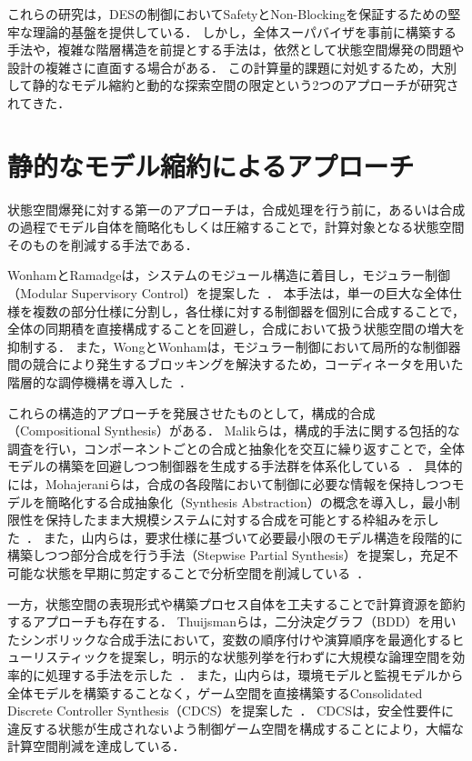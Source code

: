 \documentclass[a4paper,11pt,oneside,openany,report,dvipdfmx]{jsbook}
\begin{document}
これらの研究は，DESの制御においてSafetyとNon-Blockingを保証するための堅牢な理論的基盤を提供している．
しかし，全体スーパバイザを事前に構築する手法や，複雑な階層構造を前提とする手法は，依然として状態空間爆発の問題や設計の複雑さに直面する場合がある．
この計算量的課題に対処するため，大別して静的なモデル縮約と動的な探索空間の限定という2つのアプローチが研究されてきた．

\section{静的なモデル縮約によるアプローチ}

状態空間爆発に対する第一のアプローチは，合成処理を行う前に，あるいは合成の過程でモデル自体を簡略化もしくは圧縮することで，計算対象となる状態空間そのものを削減する手法である．

WonhamとRamadgeは，システムのモジュール構造に着目し，モジュラー制御（Modular Supervisory Control）を提案した~\cite{ModularSupervisoryControlOfDiscreteEventSystems}．
本手法は，単一の巨大な全体仕様を複数の部分仕様に分割し，各仕様に対する制御器を個別に合成することで，全体の同期積を直接構成することを回避し，合成において扱う状態空間の増大を抑制する．
また，WongとWonhamは，モジュラー制御において局所的な制御器間の競合により発生するブロッキングを解決するため，コーディネータを用いた階層的な調停機構を導入した~\cite{ModularControlAndCoordinationOfDiscreteEventSystems}．

これらの構造的アプローチを発展させたものとして，構成的合成（Compositional Synthesis）がある．
Malikらは，構成的手法に関する包括的な調査を行い，コンポーネントごとの合成と抽象化を交互に繰り返すことで，全体モデルの構築を回避しつつ制御器を生成する手法群を体系化している~\cite{ASurveyOnCompositionalAlgorithmsForVerificationAndSynthesisInSupervisoryControl}．
具体的には，Mohajeraniらは，合成の各段階において制御に必要な情報を保持しつつモデルを簡略化する合成抽象化（Synthesis Abstraction）の概念を導入し，最小制限性を保持したまま大規模システムに対する合成を可能とする枠組みを示した~\cite{CompositionalSynthesisOfDiscreteEventSystemsUsingSynthesisAbstraction}．
また，山内らは，要求仕様に基づいて必要最小限のモデル構造を段階的に構築しつつ部分合成を行う手法（Stepwise Partial Synthesis）を提案し，充足不可能な状態を早期に剪定することで分析空間を削減している~\cite{StepwisePartialSynthesis}．

一方，状態空間の表現形式や構築プロセス自体を工夫することで計算資源を節約するアプローチも存在する．
Thuijsmanらは，二分決定グラフ（BDD）を用いたシンボリックな合成手法において，変数の順序付けや演算順序を最適化するヒューリスティックを提案し，明示的な状態列挙を行わずに大規模な論理空間を効率的に処理する手法を示した~\cite{ReducingTheComputationalEffortOfSymbolicSupervisorSynthesis}．
また，山内らは，環境モデルと監視モデルから全体モデルを構築することなく，ゲーム空間を直接構築するConsolidated Discrete Controller Synthesis（CDCS）を提案した~\cite{ConsolidatedDiscreteControllerSynthesis}．
CDCSは，安全性要件に違反する状態が生成されないよう制御ゲーム空間を構成することにより，大幅な計算空間削減を達成している．
\end{document}
